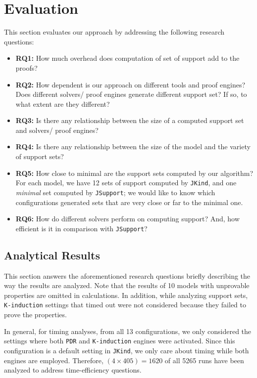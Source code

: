 \section{Evaluation}
\label{sec:eval}
This section evaluates our approach by addressing the following research questions:

\begin{itemize}
    \item \textbf{RQ1:} How much overhead does computation of set of support add to the proofs? 
    \item \textbf{RQ2:} How dependent is our approach on different tools and proof engines? Does different solvers/ proof engines generate different support set? If so, to what extent are they different?
    \item \textbf{RQ3:} Is there any relationship between the size of a computed support set and 
    solvers/ proof engines? 
    \item \textbf{RQ4:} Is there any relationship between the size of the model and the variety of support sets?
    \item \textbf{RQ5:} How close to minimal are the support sets computed by our algorithm? For each model, we have 12 sets of support computed by \texttt{JKind}, and one \emph{minimal} set computed by \texttt{JSupport}; we would like to know which configurations generated sets that are very close or far to the minimal one.
    \item \textbf{RQ6:} How do different solvers perform on computing support? And, how efficient is it in comparison with \texttt{JSupport}?
\end{itemize} 

\subsection{Analytical Results}
\label{sec:res}
This section answers the aforementioned research questions briefly describing the way the results are analyzed. Note that the results of 10 models with unprovable properties are omitted in calculations. In addition, while analyzing support sets, \texttt{K-induction} settings that timed out were not considered because they failed to prove the properties. 

In general, for timing analyses, from all 13 configurations, we only considered the settings where both \texttt{PDR} and \texttt{K-induction} engines were activated. Since this configuration is a default setting in \texttt{JKind}, we only care about timing while both engines are employed. Therefore, $(4 \times 405) = 1620$ of all 5265 runs have been analyzed to address time-efficiency questions.


